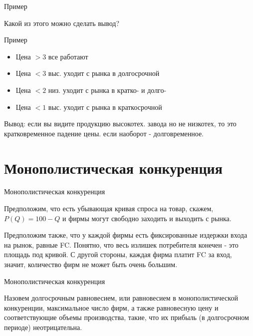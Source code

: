 \documentclass{beamer}
\begin{document}
\begin{frame}{Пример}

Какой из этого можно сделать вывод?
	
\end{frame}

\begin{frame}{Пример}
	
\begin{itemize}
  \item Цена $>3$ все работают
  \item Цена $<3$ выс. уходит с рынка в долгосрочной
  \item Цена $<2$ низ. уходит с рынка в кратко- и долго-
  \item Цена $<1$ выс. уходит с рынка в краткосрочной
\end{itemize}

Вывод: если вы видите продукцию высокотех. завода но не низкотех, то это кратковременное падение цены. если наоборот - долговременное.
	
\end{frame}

\section{Монополистическая конкуренция}

\begin{frame}{Монополистическая конкуренция}

Предположим, что есть убывающая кривая спроса на товар, скажем, $P(Q) = 100 - Q$ и фирмы могут свободно заходить и выходить с рынка.

Предположим также, что у каждой фирмы есть фиксированные издержки входа на рынок, равные FC. Понятно, что весь излишек потребителя конечен - это площадь под кривой. С другой стороны, каждая фирма платит FC за вход, значит, количество фирм не может быть очень большим.
	
\end{frame}

\begin{frame}{Монополистическая конкуренция}

\begin{definition}
Назовем \alert{долгосрочным равновесием, или равновесием в монополистической конкуренции}, максимальное число фирм, а также равновесную цену и соответствующие объемы производства, такие, что их прибыль (в долгосрочном периоде) неотрицательна.
\end{definition}

\end{frame}
\end{document}

